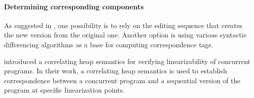 \paragraph{Determining corresponding components}

As suggested in \cite{Horwitz:PLDI90}, one possibility is to rely on the editing sequence that creates the new version from the original one. Another option is using various syntactic differencing algorithms as a base for computing correspondence tags.


\cite{ARRSY:CAV07} introduced a correlating heap semantics for verifying linearizability of concurrent programs. In their work, a correlating heap semantics is used to establish correspondence between a concurrent program and a sequential version of the program at specific linearization points.  